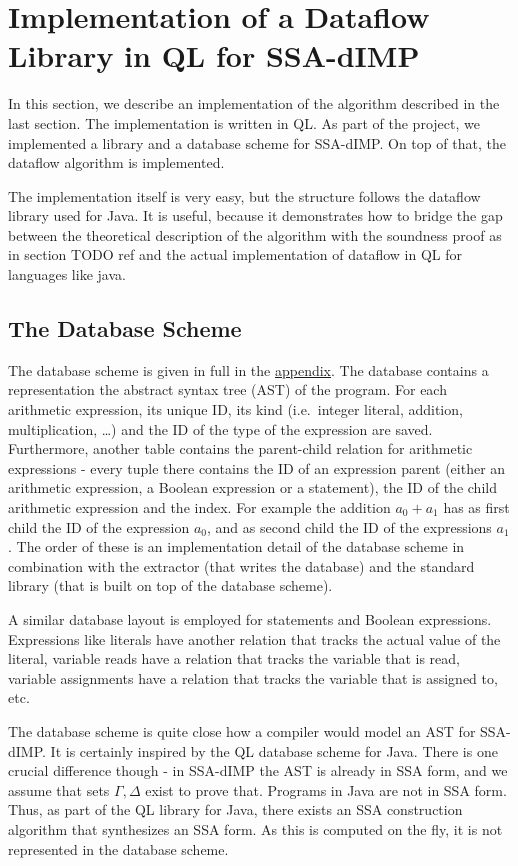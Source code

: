 \section{Implementation of a Dataflow Library in QL for SSA-dIMP}

In this section, we describe an implementation of the algorithm described in the
last section.
The implementation is written in QL.
As part of the project, we implemented a library and a database scheme for SSA-dIMP.
On top of that, the dataflow algorithm is implemented.

The implementation itself is very easy, but the structure follows the
dataflow library used for Java.
It is useful, because it demonstrates how to bridge the gap between
the theoretical description of the algorithm with the soundness proof
as in section TODO ref and the actual implementation of dataflow
in QL for languages like java.

\subsection{The Database Scheme}
The database scheme is given in full in the \hyperref[lst:dbscheme]{appendix}.
The database contains a representation the abstract syntax tree (AST) of the program.
For each arithmetic expression, its unique ID, its kind
(i.e.\ integer literal, addition, multiplication, \ldots) 
and the ID of the type of the expression are saved.
Furthermore, another table contains the parent-child relation for arithmetic 
expressions - every tuple there contains the ID of an expression parent 
(either an arithmetic expression, a Boolean expression or a statement),
the ID of the child arithmetic expression and the index.
For example the addition $a_0 + a_1$ has as first child the ID of the expression 
$a_0$, and as second child the ID of the expressions $a_1$.
The order of these is an implementation detail of the database scheme in combination
with the extractor (that writes the database) and the standard library 
(that is built on top of the database scheme).

A similar database layout is employed for statements and Boolean expressions.
Expressions like literals have another relation that tracks the actual value of the
literal, variable reads have a relation that tracks the variable that is read,
variable assignments have a relation that tracks the variable that is assigned to, etc.

The database scheme is quite close how a compiler would model an AST for SSA-dIMP.
It is certainly inspired by the QL database scheme for Java.
There is one crucial difference though - in SSA-dIMP the AST is already in SSA form,
and we assume that sets $\Gamma, \Delta$ exist to prove that.
Programs in Java are not in SSA form.
Thus, as part of the QL library for Java, there exists an SSA construction algorithm
that synthesizes an SSA form.
As this is computed on the fly, it is not represented in the database scheme.

